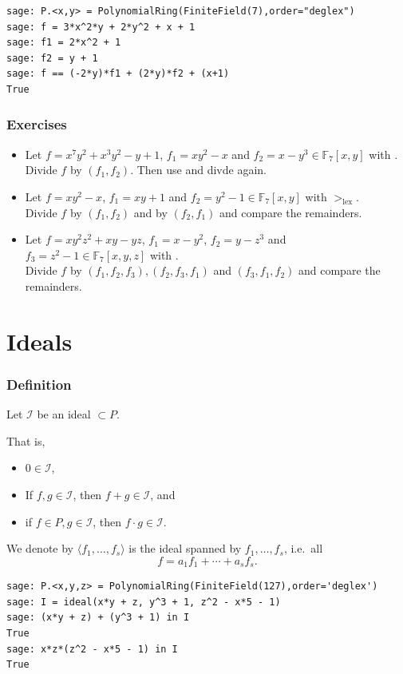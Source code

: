 \documentclass[9pt]{beamer}
\newcommand{\memph}[1]{{\color{yellow9}{\bf #1}}\xspace}
\newcommand{\F}[1][]{\ensuremath{\mathbb{F}_{#1}}\xspace}
\newcommand{\I}{\ensuremath{\mathcal{I}}\xspace}
\newcommand{\ideal}[1]{\ensuremath{\langle #1\rangle}\xspace}
\begin{document}
\begin{frame}
\framebreak

\begin{lstlisting}
sage: P.<x,y> = PolynomialRing(FiniteField(7),order="deglex")      
sage: f = 3*x^2*y + 2*y^2 + x + 1
sage: f1 = 2*x^2 + 1
sage: f2 = y + 1
sage: f == (-2*y)*f1 + (2*y)*f2 + (x+1)
True
\end{lstlisting}

\end{frame}

\begin{frame}
\frametitle{Exercises}
\begin{itemize}
\item Let $f = x^7y^2 + x^3y^2 - y + 1$, $f_1 = xy^2 - x$ and $f_2 = x-y^3 \in \F[7][x,y]$ with \memph{deglex}. Divide $f$ by $(f_1,f_2)$. Then use \memph{lex} and divde again.

\item Let $f = xy^2 - x$, $f_1 = xy + 1$ and $f_2 = y^2 -1 \in \F[7][x,y]$ with $>_{\textrm{lex}}$.\\
Divide $f$ by $(f_1,f_2)$ and by $(f_2,f_1)$ and compare the remainders.

\item Let $f = xy^2z^2 + xy - yz$, $f_1 = x - y^2$, $f_2 = y-z^3$ and $f_3 = z^2 -1 \in \F[7][x,y,z]$ with \memph{deglex}.\\
Divide $f$ by $(f_1,f_2,f_3), (f_2,f_3,f_1)$ and $(f_3,f_1,f_2)$ and compare the remainders.
\end{itemize}
\end{frame}


\section{Ideals}

\begin{frame}[fragile]
\frametitle{Definition}
Let $\I$ be an ideal $ \subset P$. 

\vspace{1em}

That is,
\begin{itemize}
 \item $0 \in \I$,
 \item If $f,g \in \I$, then $f + g \in \I$, and 
 \item if $f \in P, g \in \I$, then $f \cdot g \in \I.$
\end{itemize}

We denote by $\ideal{f_1,\dots,f_s}$ is the ideal spanned by $f_1,\dots,f_s$, i.e.\ all
$$f = a_1f_1 + \cdots +a_sf_s.$$

\begin{lstlisting}
sage: P.<x,y,z> = PolynomialRing(FiniteField(127),order='deglex')
sage: I = ideal(x*y + z, y^3 + 1, z^2 - x*5 - 1)
sage: (x*y + z) + (y^3 + 1) in I
True
sage: x*z*(z^2 - x*5 - 1) in I
True
\end{lstlisting}
\end{frame} 
\end{document}
